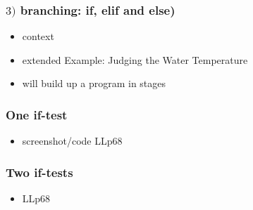 \documentclass[english,14pt]{beamer}
\begin{document}
%
%
%


\begin{frame}[fragile]

\frametitle{$3)$ branching: if, elif and else)}


\begin{itemize}
	\item context
	\item extended Example: Judging the Water Temperature %
	\item will build up a program in stages
\end{itemize}

\end{frame}


\begin{frame}[fragile]

\frametitle{One if-test}

\begin{itemize}
	\item screenshot/code LLp68
\end{itemize}

\end{frame}


\begin{frame}[fragile]

\frametitle{Two if-tests}

\begin{itemize}
	\item LLp68
\end{itemize}

\end{frame}
\end{document}
